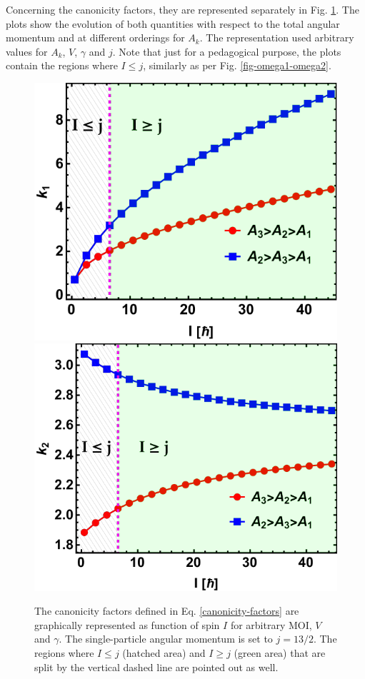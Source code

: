 Concerning the canonicity factors, they are represented separately in Fig. \ref{fig-k-1-2-factors}. The plots show the evolution of both quantities with respect to the total angular momentum and at different orderings for $A_k$. The representation used arbitrary values for $A_k$, $V$, $\gamma$ and $j$. Note that just for a pedagogical purpose, the plots contain the regions where $I\leq j$, similarly as per Fig. \ref{fig-omega1-omega2}.
\begin{figure}
    \centering
    \includegraphics[scale=0.7]{Chapters/Figures/k1_factor.pdf}
    \includegraphics[scale=0.7]{Chapters/Figures/k2_factor.pdf}
    \caption{The canonicity factors defined in Eq. \ref{canonicity-factors} are graphically represented as function of spin $I$ for arbitrary MOI, $V$ and $\gamma$. The single-particle angular momentum is set to $j=13/2$. The regions where $I\leq j$ (hatched area) and $I\geq j$ (green area) that are split by the vertical dashed line are pointed out as well.}
    \label{fig-k-1-2-factors}
\end{figure}

